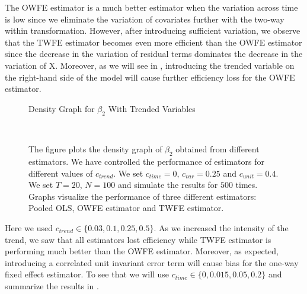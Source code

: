 \documentclass[12pt, a4paper]{article}
\begin{document}
The OWFE estimator is a much better estimator when the variation
across time is low since we eliminate the variation of covariates
further with the two-way within transformation.
However, after introducing sufficient variation, we observe that the TWFE estimator becomes even more
efficient than the OWFE estimator since the decrease in the variation of residual terms dominates the decrease in the variation of X. Moreover, as we will see in ,
introducing the trended variable on the right-hand side of the model will cause further efficiency loss for the OWFE estimator.
\begin{figure}[H]
    \caption{Density Graph for $\beta_2$ With Trended Variables}
     \\
    \caption*{\scriptsize{The figure plots the density graph of $\beta_2$
    obtained from different estimators. We have controlled the performance of
    estimators for different values of $c_{trend}$. We set $c_{time} = 0$, $c_{var} = 0.25$
    and $c_{unit} = 0.4$. We set $T = 20$, $N = 100$ and simulate the results
    for $500$ times. Graphs visualize the performance
    of three different estimators: Pooled OLS, OWFE estimator and
    TWFE estimator.
    }}
    \label{fig:c3}
\end{figure}
Here we used $c_{trend} \in \{0.03, 0.1, 0.25, 0.5\}$.  As we increased the intensity of the trend, we saw that all estimators lost efficiency while
TWFE estimator is performing much better than the OWFE estimator.
Moreover, as expected, introducing a correlated unit invariant error term will cause bias for the one-way fixed effect estimator.
To see that we will use $c_{time} \in \{0, 0.015, 0.05, 0.2\}$ and summarize the results in .
\end{document}
